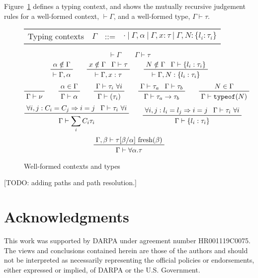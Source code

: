 \documentclass[letterpaper]{article}
\newcommand{\todo}[1]{{\color{red}[TODO: #1]}}
\begin{document}
Figure~\ref{f:ctxt} defines a typing context, and shows the mutually
recursive judgement rules for a well-formed context, $\vdash\Gamma$,
and a well-formed type, $\Gamma\vdash\tau$.

\begin{figure}
    \begin{tabular}{l c l l}
    Typing contexts        & $\Gamma$      & ::= & $\cdot\ |\ \Gamma, \alpha\ |\ \Gamma, x: \tau\ |\ \Gamma, N: \{l_i:\tau_i\}$ \\
  \end{tabular}

  $$ \boxed{\vdash\Gamma} \qquad \boxed{\Gamma\vdash\tau} $$
  $$ \prftree{\prfassumption{\alpha\notin\Gamma}}
             {\vdash\Gamma, \alpha}\qquad
     \prftree{\prfassumption{x\notin\Gamma}}{\prfassumption{\Gamma\vdash\tau}}
             {\vdash\Gamma, x:\tau}\qquad
     \prftree{\prfassumption{N\notin\Gamma}}{\prfassumption{\Gamma\vdash\{l_i:\tau_i\}}}
             {\vdash\Gamma, N:\{l_i:\tau_i\}} $$
  $$ \prfaxiom{\Gamma\vdash\nu}\qquad
     \prftree{\prfassumption{\alpha\in\Gamma}}
             {\Gamma\vdash\alpha}\qquad
     \prftree{\prfassumption{\Gamma\vdash\tau_i\ \forall i}}
             {\Gamma\vdash(\tau_i)}\qquad
     \prftree{\prfassumption{\Gamma\vdash\tau_a}}{\prfassumption{\Gamma\vdash\tau_b}}
             {\Gamma\vdash\tau_a\rightarrow\tau_b}\qquad
     \prftree{\prfassumption{N\in\Gamma}}
             {\Gamma\vdash\texttt{typeof}(N)} $$
  $$ \prftree{\prfassumption{\forall i,j:C_i=C_j\Rightarrow i=j}}
             {\prfassumption{\Gamma\vdash\tau_i\ \forall i}}
             {\Gamma\vdash\sum_i C_i\tau_i}\qquad
     \prftree{\prfassumption{\forall i,j:l_i=l_j\Rightarrow i=j}}
             {\prfassumption{\Gamma\vdash\tau_i\ \forall i}}
             {\Gamma\vdash\{l_i:\tau_i\}} $$
  $$ \prftree{\prfassumption{\Gamma,\beta\vdash\tau[\beta/\alpha]\ \textrm{fresh}(\beta) }}
             {\Gamma\vdash\forall\alpha.\tau} $$
  \caption{Well-formed contexts and types}
  \label{f:ctxt}
\end{figure}

\todo{adding paths and path resolution.}

\section*{Acknowledgments}
This work was supported by DARPA under agreement number HR001119C0075.
The views and conclusions contained herein are those of the authors
and should not be interpreted as necessarily representing the official
policies or endorsements, either expressed or implied, of DARPA or the
U.S. Government.



\end{document}
